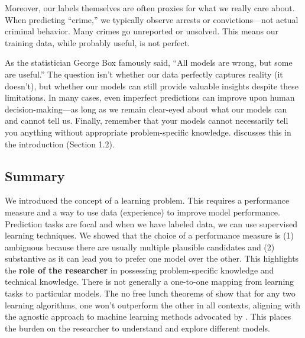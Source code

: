 Moreover, our labels themselves are often proxies for what we really care about. When predicting ``crime,'' we typically observe arrests or convictions—not actual criminal behavior. Many crimes go unreported or unsolved. This means our training data, while probably useful, is not perfect.

As the statistician George Box famously said, ``All models are wrong, but some are useful.'' The question isn't whether our data perfectly captures reality (it doesn't), but whether our models can still provide valuable insights despite these limitations. In many cases, even imperfect predictions can improve upon human decision-making—as long as we remain clear-eyed about what our models can and cannot tell us. Finally, remember that your models cannot necessarily tell you anything without appropriate problem-specific knowledge. \cite{kuhn2013applied} discusses this in the introduction (Section 1.2).

\subsection{Summary}

We introduced the concept of a learning problem. This requires a performance measure and a way to use data (experience) to improve model performance. Prediction tasks are focal and when we have labeled data, we can use supervised learning techniques. We showed that the choice of a performance measure is (1) ambiguous because there are usually multiple plausible candidates and (2) substantive as it can lead you to prefer one model over the other. This highlights the \textbf{role of the researcher} in possessing problem-specific knowledge and technical knowledge. There is not generally a one-to-one mapping from learning tasks to particular models. The no free lunch theorems of \cite{wolpert1996lack} show that for any two learning algorithms, one won't outperform the other in all contexts, aligning with the agnostic approach to machine learning methods advocated by \cite{grimmer2021machine}. This places the burden on the researcher to understand and explore different models.
